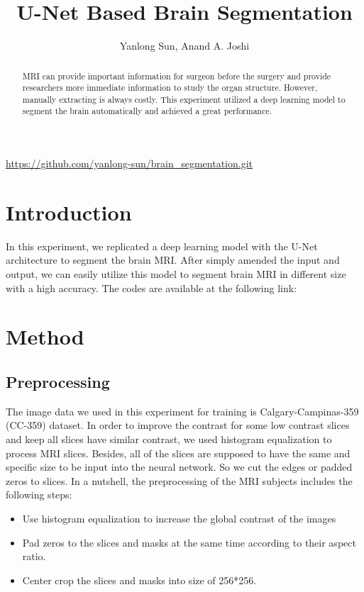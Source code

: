 \documentclass[12pt]{article}
\date{}
\title{U-Net Based Brain Segmentation}
\author{Yanlong Sun,  Anand A. Joshi}
\begin{document}
\maketitle
 \urldef{\myurl}\url{https://github.com/yanlong-sun/brain_segmentation.git}

\begin{abstract}
MRI can provide important information for surgeon before the surgery and provide researchers more immediate information to study the organ structure. However, manually extracting is always costly. This experiment utilized a deep learning model to segment the brain automatically and achieved a great performance.
\end{abstract}

\section{Introduction}
In this experiment, we replicated a deep learning model with the U-Net architecture \cite{buda} to segment the brain MRI. After simply amended the input and output, we can easily utilize this model to segment brain MRI in different size with a high accuracy.  The codes are available at the following link: \myurl
\section{Method}

\subsection{Preprocessing}
The image data we used in this experiment for training is Calgary-Campinas-359 \cite{dataset}(CC-359) dataset. In order to improve the contrast for some low contrast slices and keep all slices have similar contrast, we used histogram equalization to process MRI slices. Besides, all of the slices are supposed to have the same and specific size to be input into the neural network. So we cut the edges or padded zeros to slices. In a nutshell, the preprocessing of the MRI subjects includes the following steps:
\begin{itemize}
	\item Use histogram equalization to increase the global contrast of the images 
	\item Pad zeros to the slices and masks at the same time according to their aspect ratio.
	\item Center crop the slices and masks into size of 256*256.
\end{itemize} 
\end{document}
